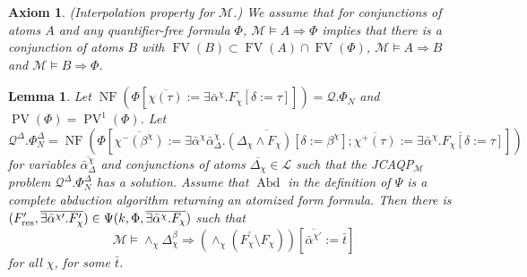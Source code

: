 \documentclass{article}
\newcommand{\assign}{:=}
\newcommand{\tmop}[1]{\ensuremath{\operatorname{#1}}}
\newtheorem{axiom}{Axiom}
\newtheorem{lemma}{Lemma}
\begin{document}
\begin{axiom}
  (Interpolation property for $\mathcal{M}$.) We assume that for conjunctions
  of atoms $A$ and any quantifier-free formula $\Phi$, $\mathcal{M} \vDash A
  \Rightarrow \Phi$ implies that there is a conjunction of atoms $B$ with
  $\tmop{FV} (B) \subset \tmop{FV} (A) \cap \tmop{FV} (\Phi)$, $\mathcal{M}
  \vDash A \Rightarrow B$ and $\mathcal{M} \vDash B \Rightarrow \Phi$.
\end{axiom}

\begin{lemma}
  \label{OpComplLemma}Let $\tmop{NF} (\Phi [\overline{\chi (\tau)} \assign
  \overline{\exists \bar{\alpha}^{\chi} .F_{\chi} [\delta \assign \tau]}])
  =\mathcal{Q}. \Phi_N^{}$ and $\tmop{PV} (\Phi) = \tmop{PV}^1 (\Phi)$. Let
  \[ \mathcal{Q}^{\Delta} . \Phi_N^{\Delta} = \tmop{NF} (\Phi
     [\overline{\chi^- (\beta^{\chi})} \assign \overline{\exists
     \bar{\alpha}^{\chi} \bar{\alpha}^{\chi}_{\Delta} . (\Delta_{\chi} \wedge
     F_{\chi}) [\delta \assign \beta^{\chi}]} ; \overline{\chi^+ (\tau)}
     \assign \overline{\exists \bar{\alpha}^{\chi} .F_{\chi} [\delta \assign
     \tau]}]) \]
  for variables $\overline{\bar{\alpha}^{\chi}_{\Delta}}$ and conjunctions of
  atoms $\overline{\Delta_{\chi}} \in \mathcal{L}$ such that the
  JCAQP$_{\mathcal{M}}$ problem $\mathcal{Q}^{\Delta} . \Phi_N^{\Delta}$ has a
  solution. Assume that $\tmop{Abd}$ in the definition of $\Psi$ is a complete
  abduction algorithm returning an atomized form formula. Then there is
  $(F_{\tmop{res}}^{\prime}, {\nobreak} \overline{\exists \bar{\alpha}^{\chi
  \prime} .F_{\chi}^{\prime}}) \in \Psi (k, \Phi, \overline{\exists
  \bar{\alpha}^{\chi} .F_{\chi}})$ such that
  \[ \mathcal{M} \vDash \wedge_{\chi} \Delta_{\chi}^{\beta} \Rightarrow
     (\wedge_{\chi} (F^{\prime}_{\chi} \setminus F_{\chi}))
     [\overline{\bar{\alpha}^{\chi \prime}} \assign \bar{t}] \]
  for all $\chi$, for some $\bar{t}$.
\end{lemma}
\end{document}
